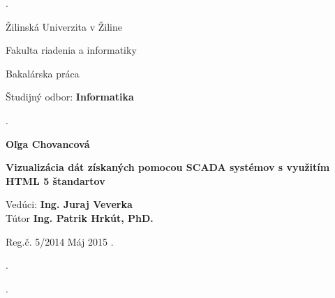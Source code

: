 \hypersetup{pageanchor=false} 

\begin{titlepage}
\phantom.

\bigskip

\begin{center}
{\sc\LARGE Žilinská Univerzita v Žiline}
\medskip

{\sc\Large Fakulta riadenia a informatiky}

\vfill\vfill\vfill\vfill

{\sc\LARGE Bakalárska práca}

\medskip

{\large Študijný odbor: {\bf Informatika}}
\end{center}


\vfill\vfill\vfill\vfill


\phantom.\hfill
\begin{center}
{\large\bf Oľga Chovancová}

\medskip

{\large\bf Vizualizácia dát získaných pomocou SCADA systémov s využitím HTML 5 štandartov}

\medskip

Vedúci: {\bf Ing. Juraj Veverka}\\
Tútor	\textbf{Ing. Patrik Hrkút, PhD.}
\medskip
 
\hfill
Reg.č. 5/2014
\hfill
Máj 2015
\hfill\phantom.
\end{center}
\hspace{1.7cm}\phantom.

\vspace{2.9cm}

\phantom.
\end{titlepage}



